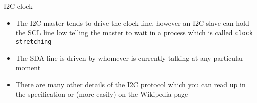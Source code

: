\begin{frame}
   {I2C clock}
   \begin{itemize}
      \item The I2C master tends to drive the clock line, however an I2C slave can
	      hold the SCL line low telling the master to wait in a process
	   which is called \verb?clock stretching?
      \item The SDA line is driven by whomever is currently talking at any
	      particular moment
      \item There are many other details of the I2C protocol which you can read up
	      in the specification or (more easily) on the Wikipedia page
   \end{itemize}
\end{frame}

\cprotect{}

